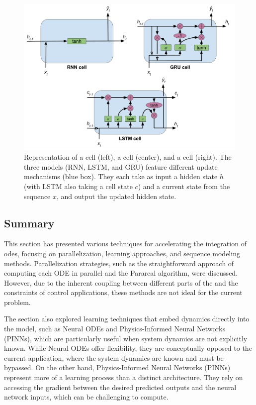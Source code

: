 \begin{figure} [htp]
    \centering
    \includegraphics[width=0.8\linewidth]{figures/learning_quadrotor/cells.png}%
    \caption{Representation of a  cell (left), a  cell (center), and a  cell (right).
    The three models (RNN, LSTM, and GRU) feature different update mechanisms (blue box). They each take as input a hidden state $h$ (with LSTM also taking a cell state $c$) and a current state from the sequence $x$, and output the updated hidden state.
    }%
    \label{fig:rnns}%
\end{figure}

\subsection{Summary}

This section has presented various techniques for accelerating the integration of \gls{odes}, focusing on parallelization, learning approaches, and sequence modeling methods. 
Parallelization strategies, such as the straightforward approach of computing each ODE in parallel and the Parareal algorithm, were discussed. 
However, due to the inherent coupling between different parts of the  and the constraints of control applications, these methods are not ideal for the current problem.

The section also explored learning techniques that embed  dynamics directly into the model, such as Neural ODEs and Physics-Informed Neural Networks (PINNs), which are particularly useful when system dynamics are not explicitly known. 
While Neural ODEs offer flexibility, they are conceptually opposed to the current application, where the system dynamics are known and must be bypassed. 
On the other hand, Physics-Informed Neural Networks (PINNs) represent more of a learning process than a distinct architecture. 
They rely on accessing the gradient between the desired predicted outputs and the neural network inputs, which can be challenging to compute.

